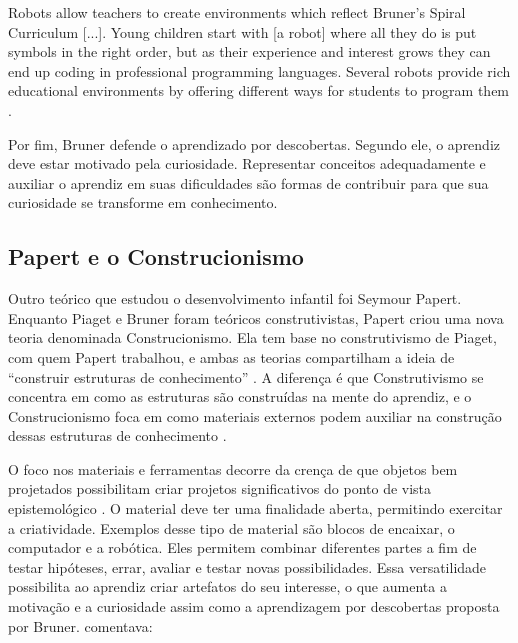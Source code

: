 \begin{citacao}
Robots allow teachers to create environments which reflect Bruner’s Spiral Curriculum [...]. Young children start with [a robot] where all they do is put symbols in the right order, but as their experience and interest grows they can end up coding in professional programming languages. Several robots provide rich educational environments by offering different ways for students to program them \cite{catlin_edurobots_2018}.
\end{citacao}


Por fim, Bruner defende o aprendizado por descobertas. Segundo ele, o aprendiz deve estar motivado pela curiosidade. Representar conceitos adequadamente e auxiliar o aprendiz em suas dificuldades são formas de contribuir para que sua curiosidade se transforme em conhecimento.

\subsection{Papert e o Construcionismo}

Outro teórico que estudou o desenvolvimento infantil foi Seymour Papert. Enquanto Piaget e Bruner foram teóricos construtivistas, Papert criou uma nova teoria denominada Construcionismo. Ela tem base no construtivismo de Piaget, com quem Papert trabalhou, e ambas as teorias compartilham a ideia de “construir estruturas de conhecimento” \cite{papert_situating_1991}. A diferença é que Construtivismo se concentra em como as estruturas são construídas na mente do aprendiz, e o Construcionismo foca em como materiais externos podem auxiliar na construção dessas estruturas de conhecimento \cite{bers_blocks_2008}.

O foco nos materiais e ferramentas decorre da crença de que objetos bem projetados possibilitam criar projetos significativos do ponto de vista epistemológico \cite{bers_blocks_2008}. O material deve ter uma finalidade aberta, permitindo exercitar a criatividade. Exemplos desse tipo de material são blocos de encaixar, o computador e a robótica. Eles permitem combinar diferentes partes a fim de testar hipóteses, errar, avaliar e testar novas possibilidades. Essa versatilidade possibilita ao aprendiz criar artefatos do seu interesse, o que aumenta a motivação e a curiosidade assim como a aprendizagem por descobertas proposta por Bruner.  comentava:

